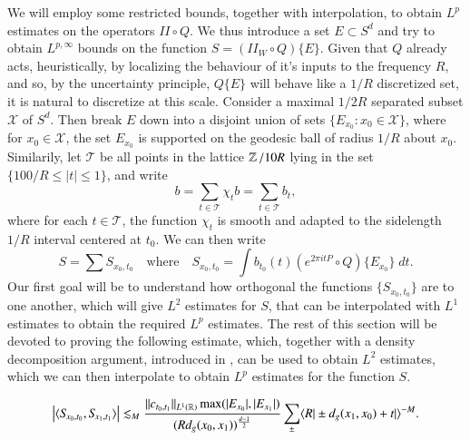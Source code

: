 We will employ some restricted bounds, together with interpolation, to obtain $L^p$ estimates on the operators $II \circ Q$. We thus introduce a set $E \subset S^d$ and try to obtain $L^{p,\infty}$ bounds on the function $S = (II_W \circ Q) \{ E \}$. Given that $Q$ already acts, heuristically, by localizing the behaviour of it's inputs to the frequency $R$, and so, by the uncertainty principle, $Q \{ E \}$ will behave like a $1/R$ discretized set, it is natural to discretize at this scale. Consider a maximal $1/2R$ separated subset $\mathcal{X}$ of $S^d$. Then break $E$ down into a disjoint union of sets $\{ E_{x_0}: x_0 \in \mathcal{X} \}$, where for $x_0 \in \mathcal{X}$, the set $E_{x_0}$ is supported on the geodesic ball of radius $1/R$ about $x_0$. Similarily, let $\mathcal{T}$ be all points in the lattice $\operatorname{\mathbb{Z}} / 10 R$ lying in the set $\{ 100/R \leq |t| \leq 1 \}$, and write
%
\[ b = \sum_{t \in \mathcal{T}} \chi_t b = \sum_{t \in \mathcal{T}} b_t, \]
%
where for each $t \in \mathcal{T}$, the function $\chi_t$ is smooth and adapted to the sidelength $1/R$ interval centered at $t_0$. We can then write
%
\[ S = \sum {S\!}_{x_0,t_0} \quad\text{where}\quad {S\!}_{x_0,t_0} = \int b_{t_0}(t) (e^{2 \pi i t P} \circ Q) \{ E_{x_0} \}\; dt. \]
%
Our first goal will be to understand how orthogonal the functions $\{ {S\!}_{x_0,t_0} \}$ are to one another, which will give $L^2$ estimates for $S$, that can be interpolated with $L^1$ estimates to obtain the required $L^p$ estimates. The rest of this section will be devoted to proving the following estimate, which, together with a density decomposition argument, introduced in \cite{HeoandNazarovandSeeger}, can be used to obtain $L^2$ estimates, which we can then interpolate to obtain $L^p$ estimates for the function $S$.

\begin{lemma} \label{mainOrthogonalityLemma}
    \[ \left| \langle {S\!}_{x_0,t_0}, {S\!}_{x_1,t_1} \rangle \right| \lesssim_M \frac{ \| c_{t_0,t_1} \|_{L^1(\operatorname{\mathbb{R}})} \max( |E_{x_0}|, |E_{x_1}| ) }{( R d_g(x_0,x_1) )^{\frac{d-1}{2}}} \sum_{\pm} \langle R | \pm d_g(x_1,x_0) + t | \rangle^{-M}. \]
\end{lemma}

